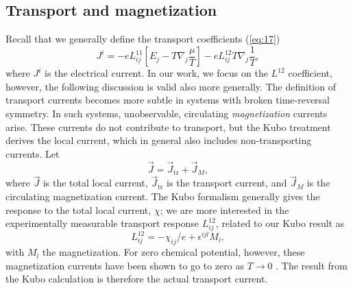 \subsection{Transport and magnetization}
\label{sec:transport-magnetization}
Recall that we generally define the transport coefficients (\cref{eq:17})
\[
J^i = -e L_{ij}^{11} \left[
          E_j - T \nabla_j \frac{\mu}{T}
  \right] - e L^{12}_{ij} T \nabla_j \frac{1}{T},
\]
where \( J^i \) is the electrical current.
In our work, we focus on the \( L^{12} \) coefficient, however, the following discussion is valid also more generally.
The definition of transport currents becomes more subtle in systems with broken time-reversal symmetry\cite{vanderwurffMagnetovorticalThermoelectricTransport2019, chernodubThermalTransportGeometry2021}.
In such systems, unobservable, circulating \emph{magnetization} currents arise.
These currents do not contribute to transport, but the Kubo treatment derives the local current, which in general also includes non-transporting currents.
Let
\begin{equation}
  \label{eq:23}
  \vec{J} = \vec{J}_{\text{tr}} + \vec{J}_M,
\end{equation}
where \( \vec{J} \) is the total local current, \( \vec{J}_{\text{tr}} \) is the transport current, and \( \vec{J}_M \) is the circulating magnetization current.
The Kubo formalism generally gives the response to the total local current, \( \chi \);
we are more interested in the experimentally measurable transport response \( L_{ij}^{12} \), related to our Kubo result as
\cite{chernodubThermalTransportGeometry2021}
\begin{equation}
  \label{eq:24}
  L^{12}_{ij} = -\chi_{ij} /e + \epsilon^{ijl} M_l,
\end{equation}
with \( M_l \) the magnetization.
For zero chemical potential, however, these magnetization currents have been shown to go to zero as \( T \to 0 \) \cite{vanderwurffMagnetovorticalThermoelectricTransport2019}.
The result from the Kubo calculation is therefore the actual transport current.


